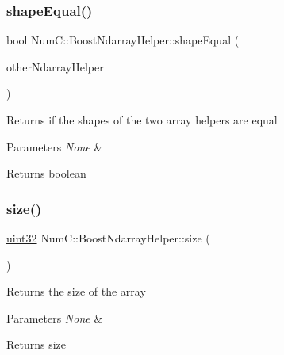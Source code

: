 \subsubsection{\texorpdfstring{shape\+Equal()}{shapeEqual()}}
{\footnotesize\ttfamily bool Num\+C\+::\+Boost\+Ndarray\+Helper\+::shape\+Equal (\begin{DoxyParamCaption}\item[{\mbox{\hyperlink{class_num_c_1_1_boost_ndarray_helper}{Boost\+Ndarray\+Helper}} \&}]{other\+Ndarray\+Helper }\end{DoxyParamCaption})\hspace{0.3cm}{\ttfamily [inline]}}

Returns if the shapes of the two array helpers are equal


\begin{DoxyParams}{Parameters}
{\em None} & \\
\hline
\end{DoxyParams}
\begin{DoxyReturn}{Returns}
boolean 
\end{DoxyReturn}
\mbox{\label{class_num_c_1_1_boost_ndarray_helper_afaa5bd97ec3de6c055069dc54c12a02a}} 
\subsubsection{\texorpdfstring{size()}{size()}}
{\footnotesize\ttfamily \mbox{\hyperlink{namespace_num_c_ae685802ca6d3035f2b400b081e3953fa}{uint32}} Num\+C\+::\+Boost\+Ndarray\+Helper\+::size (\begin{DoxyParamCaption}{ }\end{DoxyParamCaption})\hspace{0.3cm}{\ttfamily [inline]}}

Returns the size of the array


\begin{DoxyParams}{Parameters}
{\em None} & \\
\hline
\end{DoxyParams}
\begin{DoxyReturn}{Returns}
size 
\end{DoxyReturn}
\mbox{\label{class_num_c_1_1_boost_ndarray_helper_a760449f72af3dd8eadd67663feba6712}} 
